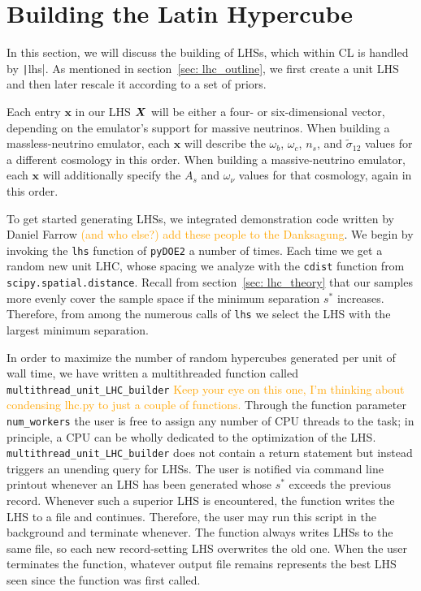 \section{Building the Latin Hypercube}
\label{sec: build_lhc}


In this section, we will discuss the building of LHSs, which within CL is 
handled by \texttt|lhs|. As mentioned in section~\ref{sec: lhc_outline},
we first create a unit LHS and then later rescale it according to a set of
priors.

Each entry $\bm{x}$ in our LHS $\bm{X}$ will be either a four- or
six-dimensional vector, 
depending on the emulator's support for massive neutrinos. When building a
massless-neutrino emulator, each $\bm{x}$ will describe the $\omega_b$,
$\omega_c$, $n_s$, and
$\tilde{\sigma}_{12}$ values for a different cosmology in 
this order. When building a massive-neutrino emulator, each $\bm{x}$ will 
additionally specify the $A_s$ and $\omega_\nu$ values for that cosmology, 
again in this order.

To get started generating LHSs, we integrated demonstration code written by 
Daniel Farrow \textcolor{orange}{(and who else?) add these people to the 
Danksagung}. We begin by invoking the \texttt{lhs} function of
\texttt{pyDOE2} a number of times. Each time we get a random new unit LHC, 
whose spacing we analyze with the \texttt{cdist} function from
\texttt{scipy.spatial.distance}.
Recall from section~\ref{sec: lhc_theory} that
our samples more evenly cover the sample space if the minimum separation
$s^*$ increases. Therefore, from among the numerous calls of \texttt{lhs} we 
select the LHS with the largest minimum separation.

In order to maximize the number of random hypercubes generated per unit of
wall time, we have written a multithreaded function called
\verb|multithread_unit_LHC_builder| \textcolor{orange}{Keep your eye on this
one, I'm thinking about condensing lhc.py to just a couple of functions.}
Through the function parameter \verb|num_workers| the user is free to assign
any number of CPU threads to the task; in principle, a CPU can be
wholly dedicated to the optimization of the LHS.
\verb|multithread_unit_LHC_builder| does not contain a return statement but
instead triggers an unending query for LHSs. The user is notified via command
line printout whenever an LHS has been generated whose $s^*$ exceeds
the previous record. Whenever such a superior LHS is
encountered, the function writes the LHS to a file and continues. Therefore,
the user may run this script in the background and terminate whenever. The
function always writes LHSs to the same file, so each new record-setting LHS
overwrites the old one. When the user terminates the function, whatever output
file remains represents the best LHS seen since the function was first called.

